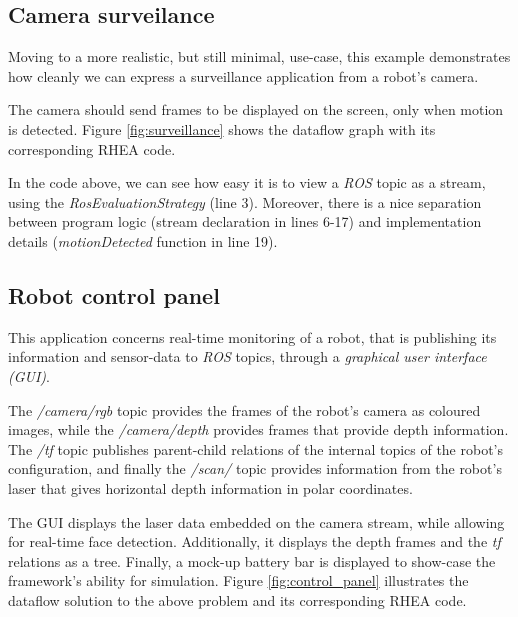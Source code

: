 \documentclass[sigplan,review,anonymous]{acmart}
\begin{document}
\subsection{Camera surveilance}

Moving to a more realistic, but still minimal, use-case, this example
demonstrates how cleanly we can express a surveillance application from a
robot's camera.

The camera should send frames to be displayed on the screen, only when motion is
detected. Figure \ref{fig:surveillance} shows the dataflow graph with its
corresponding \textsc{RHEA} code.


In the code above, we can see how easy it is to view a \textit{ROS} topic as a
stream, using the \textit{RosEvaluationStrategy} (line 3). Moreover, there is a
nice separation between program logic (stream declaration in lines 6-17) and
implementation details (\textit{motionDetected} function in line 19).

\subsection{Robot control panel}

This application concerns real-time monitoring of a robot, that is publishing
its information and sensor-data to \textit{ROS} topics, through a
\textit{graphical user interface (GUI)}.

The \textit{/camera/rgb} topic provides the frames of the robot's camera as
coloured images, while the \textit{/camera/depth} provides frames that provide
depth information. The \textit{/tf} topic publishes parent-child relations of
the internal topics of the robot's configuration, and finally the
\textit{/scan/} topic provides information from the robot's laser that gives
horizontal depth information in polar coordinates.

The GUI displays the laser data embedded on the camera stream, while allowing
for real-time face detection. Additionally, it displays the depth frames and the
\textit{tf} relations as a tree. Finally, a mock-up battery bar is displayed to
show-case the framework's ability for simulation. Figure \ref{fig:control_panel}
illustrates the dataflow solution to the above problem and its corresponding
\textsc{RHEA} code.

\end{document}
